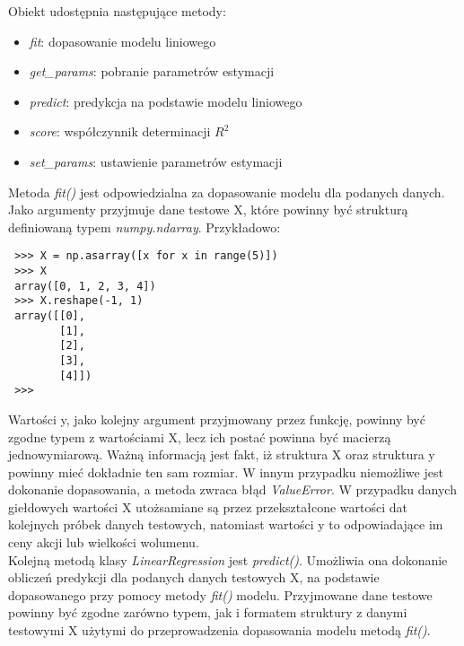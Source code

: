 Obiekt udostępnia następujące metody:
\begin{itemize}
 \item \textit{fit}: dopasowanie modelu liniowego
 \item \textit{get\_params}: pobranie parametrów estymacji
 \item \textit{predict}: predykcja na podstawie modelu liniowego
 \item \textit{score}: współczynnik determinacji $R^2$
 \item \textit{set\_params}: ustawienie parametrów estymacji\\
\end{itemize}

\newpage

Metoda \textit{fit()} jest odpowiedzialna za dopasowanie modelu dla podanych danych. Jako argumenty przyjmuje dane testowe X, które powinny być strukturą definiowaną typem \textit{numpy.ndarray}. Przykładowo:
\begin{lstlisting}
 >>> X = np.asarray([x for x in range(5)])
 >>> X
 array([0, 1, 2, 3, 4])
 >>> X.reshape(-1, 1)
 array([[0],
        [1],
        [2],
        [3],
        [4]])
 >>>
\end{lstlisting}
Wartości y, jako kolejny argument przyjmowany przez funkcję, powinny być zgodne typem z wartościami X, lecz ich postać powinna być macierzą jednowymiarową.
Ważną informacją jest fakt, iż struktura X oraz struktura y powinny mieć dokładnie ten sam rozmiar. W innym przypadku niemożliwe jest dokonanie dopasowania, a metoda zwraca błąd \textit{ValueError}.
W przypadku danych giełdowych wartości X utożsamiane są przez przekształcone wartości dat kolejnych próbek danych testowych, natomiast wartości y to odpowiadające im ceny akcji lub wielkości wolumenu.\\

Kolejną metodą klasy \textit{LinearRegression} jest \textit{predict()}. Umożliwia ona dokonanie obliczeń predykcji dla podanych danych testowych X, na podstawie dopasowanego przy pomocy metody \textit{fit()} modelu.
Przyjmowane dane testowe powinny być zgodne zarówno typem, jak i formatem struktury z danymi testowymi X użytymi do przeprowadzenia dopasowania modelu metodą \textit{fit()}.

